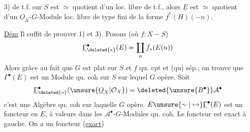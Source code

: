 

3)   de t.f. sur $S$ est $\simeq$ quotient d'un loc. libre de t.f.,  alors $\underline E$ est $\simeq$ quotient d'un $\underline O_X$-$G$-Module loc. libre de type fini de la forme $f^*(H)(-n)$, 

\uline{Dém} Il suffit de prouver 1) et 3). Posons (où $f:X-S$)
\[
\underline{\Gamma}_{\deleted{*}}^\bullet(E)=\coprod_n f_*(E(n))
\]
Alors grâce au fait que $G$ est plat sur $S$ et $f$ qu. cpt et (qu) sép., on trouve que $\Gamma^\bullet(E)$ est un Module qu. coh sur $S$ sur lequel $G$ opère. Soit
\[
\underline{\Gamma}_{\deleted{*}}^\bullet(\unsure{\underline O_X|\mathcal O_X})=\deleted{\unsure{B^\bullet}}\mathcal A^\bullet
\]
c'est une Algèbre qu. coh sur laquelle $G$ opère. $E\unsure{\sim|\mapsto}\underline{\Gamma}^\bullet(E)$ est un foncteur en $E$, à valeurs dans les  $\mathcal A^\bullet$-$G$-Modules qu. coh. Le foncteur est exact à gauche. On a un foncteur (\uline{exact})

